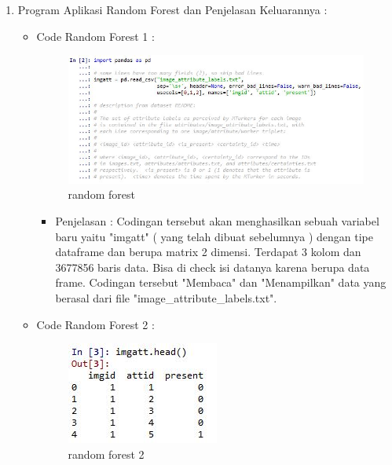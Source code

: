\begin{enumerate}
\par
\par
\item Program Aplikasi Random Forest dan Penjelasan Keluarannya :
\begin{itemize}
\item Code Random Forest 1 :
\par
\begin{figure}[ht]
\centering
\includegraphics[scale=0.2]{figures/ran1.jpg}
\caption{random forest}
\label{contoh}
\end{figure}
\par
\begin{itemize}
\item Penjelasan : Codingan tersebut akan menghasilkan sebuah variabel baru yaitu "imgatt" ( yang telah dibuat sebelumnya ) dengan tipe dataframe dan berupa matrix 2 dimensi. Terdapat 3 kolom dan 3677856 baris data. Bisa di check isi datanya karena berupa data frame. Codingan tersebut "Membaca" dan "Menampilkan" data yang berasal dari file "image\_attribute\_labels.txt".
\par 
\par
\end{itemize}
\item Code Random Forest 2 :
\par
\begin{figure}[ht]
\centering
\includegraphics[scale=0.4]{figures/ran2.jpg}
\caption{random forest 2}
\label{contoh}
\end{figure}
\par
\begin{itemize}

\end{itemize}
\end{itemize}
\end{enumerate}
